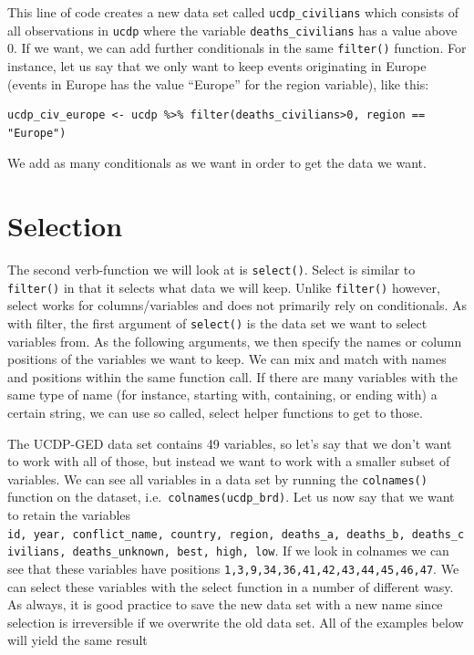 \documentclass[
]{book}
\begin{document}
This line of code creates a new data set called \texttt{ucdp\_civilians} which consists of all observations in \texttt{ucdp} where the variable \texttt{deaths\_civilians} has a value above 0. If we want, we can add further conditionals in the same \texttt{filter()} function. For instance, let us say that we only want to keep events originating in Europe (events in Europe has the value ``Europe'' for the region variable), like this:

\begin{verbatim}
ucdp_civ_europe <- ucdp %>% filter(deaths_civilians>0, region == "Europe")
\end{verbatim}

We add as many conditionals as we want in order to get the data we want.

\hypertarget{selection}{%
\section{Selection}\label{selection}}

The second verb-function we will look at is \texttt{select()}. Select is similar to \texttt{filter()} in that it selects what data we will keep. Unlike \texttt{filter()} however, select works for columns/variables and does not primarily rely on conditionals. As with filter, the first argument of \texttt{select()} is the data set we want to select variables from. As the following arguments, we then specify the names or column positions of the variables we want to keep. We can mix and match with names and positions within the same function call. If there are many variables with the same type of name (for instance, starting with, containing, or ending with) a certain string, we can use so called, select helper functions to get to those.

The UCDP-GED data set contains 49 variables, so let's say that we don't want to work with all of those, but instead we want to work with a smaller subset of variables. We can see all variables in a data set by running the \texttt{colnames()} function on the dataset, i.e.~\texttt{colnames(ucdp\_brd)}. Let us now say that we want to retain the variables \texttt{id,\ year,\ conflict\_name,\ country,\ region,\ deaths\_a,\ deaths\_b,\ deaths\_civilians,\ deaths\_unknown,\ best,\ high,\ low}. If we look in colnames we can see that these variables have positions \texttt{1,3,9,34,36,41,42,43,44,45,46,47}. We can select these variables with the select function in a number of different wasy. As always, it is good practice to save the new data set with a new name since selection is irreversible if we overwrite the old data set. All of the examples below will yield the same result
\end{document}
